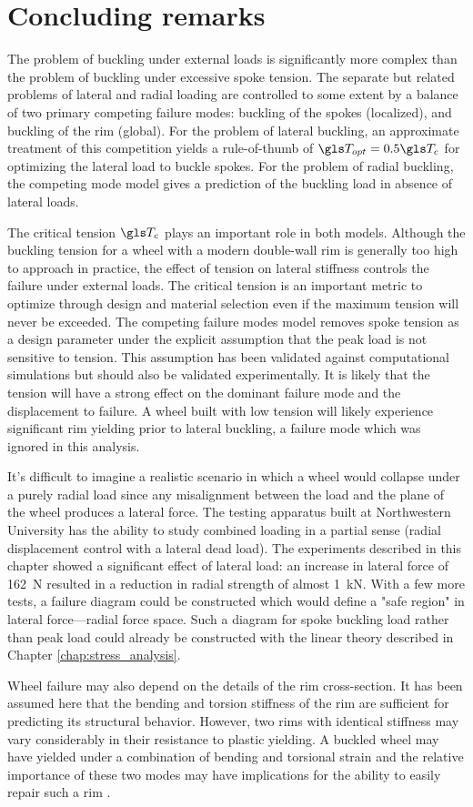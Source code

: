 \documentclass[\rootdir/thesis.tex]{subfiles}
\begin{document}
\section{Concluding remarks}

The problem of buckling under external loads is significantly more complex than the problem of buckling under excessive spoke tension. The separate but related problems of lateral and radial loading are controlled to some extent by a balance of two primary competing failure modes: buckling of the spokes (localized), and buckling of the rim (global). For the problem of lateral buckling, an approximate treatment of this competition yields a rule-of-thumb of $\T_{opt} = 0.5\T_c$ for optimizing the lateral load to buckle spokes. For the problem of radial buckling, the competing mode model gives a prediction of the buckling load in absence of lateral loads.

The critical tension $\T_c$ plays an important role in both models. Although the buckling tension for a wheel with a modern double-wall rim is generally too high to approach in practice, the effect of tension on lateral stiffness controls the failure under external loads. The critical tension is an important metric to optimize through design and material selection even if the maximum tension will never be exceeded. The competing failure modes model removes spoke tension as a design parameter under the explicit assumption that the peak load is not sensitive to tension. This assumption has been validated against computational simulations but should also be validated experimentally. It is likely that the tension will have a strong effect on the dominant failure mode and the displacement to failure. A wheel built with low tension will likely experience significant rim yielding prior to lateral buckling, a failure mode which was ignored in this analysis.

It's difficult to imagine a realistic scenario in which a wheel would collapse under a purely radial load since any misalignment between the load and the plane of the wheel produces a lateral force. The testing apparatus built at Northwestern University has the ability to study combined loading in a partial sense (radial displacement control with a lateral dead load). The experiments described in this chapter showed a significant effect of lateral load: an increase in lateral force of \SI{162}{N} resulted in a reduction in radial strength of almost \SI{1}{kN}. With a few more tests, a failure diagram could be constructed which would define a "safe region" in lateral force---radial force space. Such a diagram for spoke buckling load rather than peak load could already be constructed with the linear theory described in Chapter \ref{chap:stress_analysis}.

Wheel failure may also depend on the details of the rim cross-section. It has been assumed here that the bending and torsion stiffness of the rim are sufficient for predicting its structural behavior. However, two rims with identical stiffness may vary considerably in their resistance to plastic yielding. A buckled wheel may have yielded under a combination of bending and torsional strain and the relative importance of these two modes may have implications for the ability to easily repair such a rim \cite{Wilson2004}.
\end{document}
